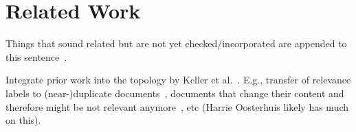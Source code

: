 \section{Related Work}

Things that sound related but are not yet checked/incorporated are appended to this sentence~\cite{li:2022}.

Integrate prior work into the topology by Keller et al.~\cite{keller:2024}. E.g., transfer of relevance labels to (near-)duplicate documents~\cite{froebe:2021a}, documents that change their content and therefore might be not relevant anymore~\cite{froebe:2022d}, etc (Harrie Oosterhuis likely has much on this).

